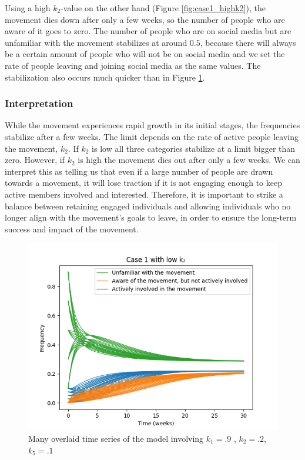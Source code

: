 \documentclass{article}
\begin{document}
    Using a high $k_2$-value on the other hand (Figure \ref{fig:case1_highk2}), the movement dies down after only a few weeks, so the number of people who are aware of it goes to zero. The number of people who are on social media but are unfamiliar with the movement stabilizes at around $0.5$, because there will always be a certain amount of people who will not be on social media and we set the rate of people leaving and joining social media as the same values. The stabilization also occurs much quicker than in Figure \ref{fig:case1_lowk2}. 
    
    \subsubsection*{Interpretation}  While the movement experiences rapid growth in its initial stages, the frequencies stabilize after a few weeks. The limit depends on the rate of active people leaving the movement, $k_2$. If $k_2$ is low all three categories stabilize at a limit bigger than zero. However, if $k_2$ is high the movement dies out after only a few weeks. We can interpret this as telling us that even if a large number of people are drawn towards a movement, it will lose traction if it is not engaging enough to keep active members involved and interested. Therefore, it is important to strike a balance between retaining engaged individuals and allowing individuals who no longer align with the movement's goals to leave, in order to ensure the long-term success and impact of the movement. 
    
    \begin{figure}[H]

        \centering
        \includegraphics[width=\textwidth]{simulation/plots/case1-lowk2.png}   
        \caption{Many overlaid time series of the model involving \mbox{$k_1=.9$} , \mbox{$k_2=.2$}, \mbox{$k_5=.1$}}
        \label{fig:case1_lowk2}
    \end{figure}
\end{document}
